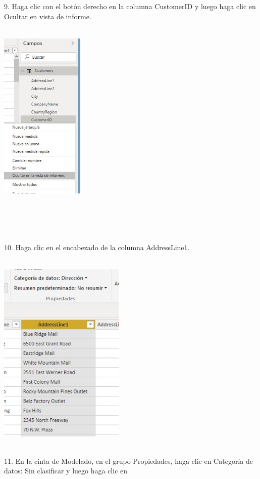 \begin{flushleft}
\begin{itemize}
9. Haga clic con el botón derecho en la columna CustomerID y luego haga clic en Ocultar en vista de informe.\\
\textbf{ }\\
\begin{center}
	\includegraphics[width=4cm]{./Imagenes/image11} 
	\end{center}
\textbf{ }\\
\textbf{ }\\
\textbf{ }\\
\textbf{ }\\
10. Haga clic en el encabezado de la columna AddressLine1.\\
\textbf{ }\\
\begin{center}
	\includegraphics[width=6cm]{./Imagenes/image12} 
	\end{center}
\textbf{ }\\
11. En la cinta de Modelado, en el grupo Propiedades, haga clic en Categoría de datos: Sin clasificar y luego haga clic en

\end{itemize}
\end{flushleft}

